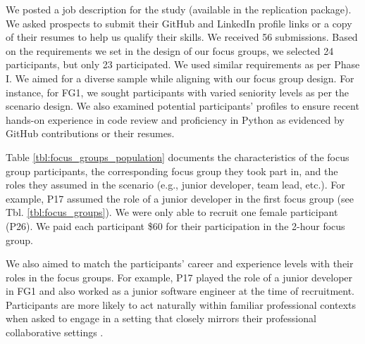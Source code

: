 We posted a job description for the study (available in the replication package). We asked prospects to submit their GitHub and LinkedIn profile links or a copy of their resumes to help us qualify their skills. We received 56 submissions. Based on the requirements we set in the design of our focus groups, we selected 24 participants, but only 23 participated. We used similar requirements as per Phase I. We aimed for a diverse sample while aligning with our focus group design. For instance, for FG1, we sought participants with varied seniority levels as per the scenario design. We also examined potential participants' profiles to ensure recent hands-on experience in code review and proficiency in Python as evidenced by GitHub contributions or their resumes.

Table \ref{tbl:focus_groups_population} documents the characteristics of the focus group participants, the corresponding focus group they took part in, and the roles they assumed in the scenario (e.g., junior developer, team lead, etc.). For example, P17 assumed the role of a junior developer in the first focus group (see Tbl. \ref{tbl:focus_groups}). We were only able to recruit one female participant (P26). We paid each participant \$60 for their participation in the 2-hour focus group.

We also aimed to match the participants' career and experience levels with their roles in the focus groups. For example, P17 played the role of a junior developer in FG1 and also worked as a junior software engineer at the time of recruitment. Participants are more likely to act naturally within familiar professional contexts when asked to engage in a setting that closely mirrors their professional collaborative settings \citep{jeffries2005framework,gaba2004future}.

